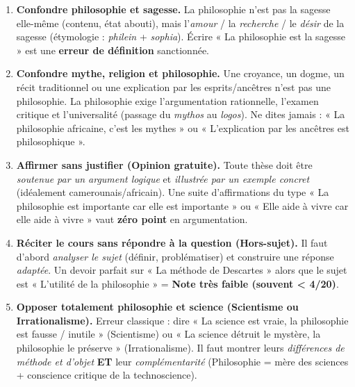 \documentclass[11pt]{article}
\newcommand{\cle}[1]{{\popxbold\color{popdark}#1}}
\begin{document}
\begin{attention}
\begin{enumerate}
\item \textbf{Confondre philosophie et sagesse.} La philosophie n'est pas la sagesse elle-même (contenu, état abouti), mais l'\emph{amour} / la \emph{recherche} / le \emph{désir} de la sagesse (étymologie : \emph{philein} + \emph{sophia}). Écrire « La philosophie est la sagesse » est une \textbf{erreur de définition} sanctionnée.
\item \textbf{Confondre mythe, religion et philosophie.} Une croyance, un dogme, un récit traditionnel ou une explication par les esprits/ancêtres n'est pas une philosophie. La philosophie exige l'\cle{argumentation rationnelle}, l'\cle{examen critique} et l'\cle{universalité} (passage du \emph{mythos} au \emph{logos}). Ne dites jamais : « La philosophie africaine, c'est les mythes » ou « L'explication par les ancêtres est philosophique ».
\item \textbf{Affirmer sans justifier (Opinion gratuite).} Toute thèse doit être \emph{soutenue par un argument logique} et \emph{illustrée par un exemple concret} (idéalement camerounais/africain). Une suite d'affirmations du type « La philosophie est importante car elle est importante » ou « Elle aide à vivre car elle aide à vivre » vaut \textbf{zéro point} en argumentation.
\item \textbf{Réciter le cours sans répondre à la question (Hors-sujet).} Il faut d'abord \emph{analyser le sujet} (définir, problématiser) et construire une réponse \emph{adaptée}. Un devoir parfait sur « La méthode de Descartes » alors que le sujet est « L'utilité de la philosophie » = \textbf{Note très faible (souvent < 4/20)}.
\item \textbf{Opposer totalement philosophie et science (Scientisme ou Irrationalisme).} Erreur classique : dire « La science est vraie, la philosophie est fausse / inutile » (Scientisme) ou « La science détruit le mystère, la philosophie le préserve » (Irrationalisme). Il faut montrer leurs \emph{différences de méthode et d'objet} \textbf{ET} leur \emph{complémentarité} (Philosophie = mère des sciences + conscience critique de la technoscience).
\end{enumerate}
\end{attention}
\end{document}
